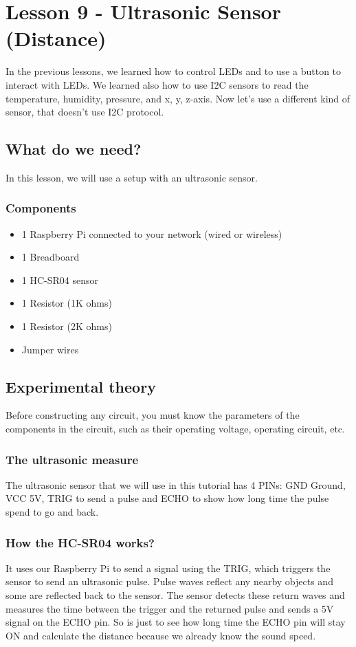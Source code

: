 \documentclass[10pt,twoside,english]{_support/latex/sbabook/sbabook}
\begin{document}
\frontmatter
\pagestyle{plain}

\tableofcontents*
\clearpage\listoffigures

\mainmatter

\chapter{Lesson 9 - Ultrasonic Sensor (Distance)}
In the previous lessons, we learned how to control LEDs and to use a button to interact with LEDs. We learned also how to use I2C sensors to read the temperature, humidity, pressure, and x, y, z-axis. Now let's use a different kind of sensor, that doesn't use I2C protocol. 
\section{What do we need?}
In this lesson, we will use a setup with an ultrasonic sensor.
\subsection{Components}
\begin{itemize}
\item 1 Raspberry Pi connected to your network (wired or wireless)
\item 1 Breadboard
\item 1 HC-SR04 sensor
\item 1 Resistor (1K ohms)
\item 1 Resistor (2K ohms)
\item Jumper wires
\end{itemize}
\section{Experimental theory}
Before constructing any circuit, you must know the parameters of the components in the circuit, such as their operating voltage, operating circuit, etc.
\subsection{The ultrasonic measure}
The ultrasonic sensor that we will use in this tutorial has 4 PINs: GND Ground, VCC 5V, TRIG to send a pulse and ECHO to show how long time the pulse spend to go and back.  
\subsection{How the HC-SR04 works?}
It uses our Raspberry Pi to send a signal using the TRIG, which triggers the sensor to send an ultrasonic pulse. Pulse waves reflect any nearby objects and some are reflected back to the sensor. The sensor detects these return waves and measures the time between the trigger and the returned pulse and sends a 5V signal on the ECHO pin. So is just to see how long time the ECHO pin will stay ON and calculate the distance because we already know the sound speed. 
\end{document}

